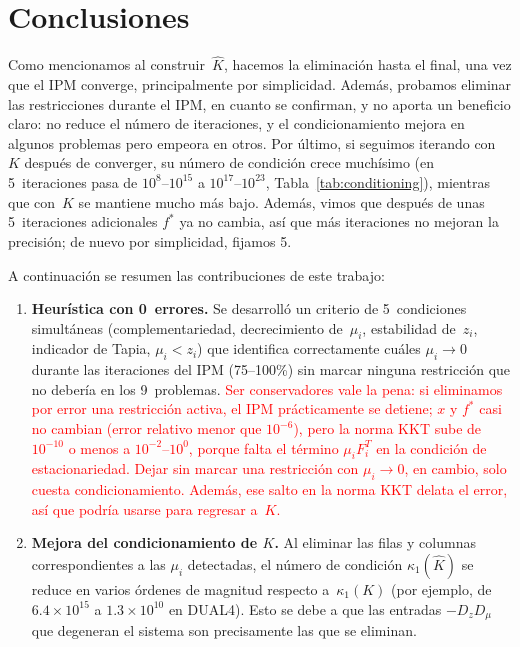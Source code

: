 \section*{Conclusiones}\label{sec:discusion}

{\color{blue}
Como mencionamos al construir~$\widehat{K}$, hacemos la eliminación hasta el final, una vez que el IPM converge, principalmente por simplicidad. Además, probamos eliminar las restricciones durante el IPM, en cuanto se confirman, y no aporta un beneficio claro: no reduce el número de iteraciones, y el condicionamiento mejora en algunos problemas pero empeora en otros. Por último, si seguimos iterando con~$K$ después de converger, su número de condición crece muchísimo (en 5~iteraciones pasa de $10^{8}$--$10^{15}$ a $10^{17}$--$10^{23}$, Tabla~\ref{tab:conditioning}), mientras que con~$\widehat{K}$ se mantiene mucho más bajo. Además, vimos que después de unas 5~iteraciones adicionales $f^*$ ya no cambia, así que más iteraciones no mejoran la precisión; de nuevo por simplicidad, fijamos 5.

A continuación se resumen las contribuciones de este trabajo:

\begin{enumerate}
    \item \textbf{Heurística con 0~errores.} Se desarrolló un criterio de 5~condiciones simultáneas (complementariedad, decrecimiento de~$\mu_i$, estabilidad de~$z_i$, indicador de Tapia, $\mu_i < z_i$) que identifica correctamente cuáles $\mu_i \to 0$ durante las iteraciones del IPM (75--100\%) sin marcar ninguna restricción que no debería en los 9~problemas. \textcolor{red}{Ser conservadores vale la pena: si eliminamos por error una restricción activa, el IPM prácticamente se detiene; $x$ y $f^*$ casi no cambian (error relativo menor que $10^{-6}$), pero la norma KKT sube de $10^{-10}$ o menos a $10^{-2}$--$10^{0}$, porque falta el término $\mu_i F_i^T$ en la condición de estacionariedad. Dejar sin marcar una restricción con $\mu_i \to 0$, en cambio, solo cuesta condicionamiento. Además, ese salto en la norma KKT delata el error, así que podría usarse para regresar a~$K$.}

    \item \textbf{Mejora del condicionamiento de $K$.} Al eliminar las filas y columnas correspondientes a las $\mu_i$ detectadas, el número de condición $\kappa_1(\widehat{K})$ se reduce en varios órdenes de magnitud respecto a~$\kappa_1(K)$ (por ejemplo, de $6{.}4 \times 10^{15}$ a $1{.}3 \times 10^{10}$ en DUAL4). Esto se debe a que las entradas $-D_z D_\mu$ que degeneran el sistema son precisamente las que se eliminan.


\end{enumerate}}
